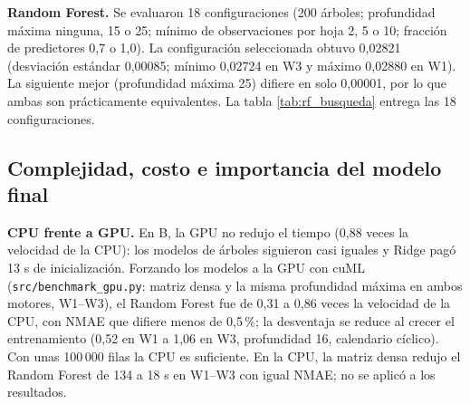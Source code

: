 \textbf{Random Forest.} Se evaluaron 18 configuraciones (200 árboles; profundidad máxima ninguna, 15 o 25; mínimo de observaciones por hoja 2, 5 o 10; fracción de predictores 0,7 o 1,0). La configuración seleccionada obtuvo 0,02821 (desviación estándar 0,00085; mínimo 0,02724 en W3 y máximo 0,02880 en W1). La siguiente mejor (profundidad máxima 25) difiere en solo 0,00001, por lo que ambas son prácticamente equivalentes. La tabla \ref{tab:rf_busqueda} entrega las 18 configuraciones.

\begin{table}[!htbp]
    \centering
        \caption{Random Forest: NMAE macro por configuración (promedio, desviación estándar, mínimo y máximo entre ventanas), ordenado por promedio. Todas con 200 árboles.\label{tab:rf_busqueda}}
        \small
        
\end{table}

\FloatBarrier
\subsection{Complejidad, costo e importancia del modelo final}

\begin{table}[!htbp]
    \centering
        \caption{Complejidad de los modelos finales ajustados con el periodo de desarrollo completo (2015--2018).\label{tab:complejidad}}
        \small
        
\end{table}

\begin{table}[!htbp]
    \centering
    \begin{minipage}[t]{0.44\textwidth}
        \caption{Ajuste final de cada procedimiento con 2015--2018 (s).\label{tab:tiempos}}
        \small
        \resizebox{\linewidth}{!}{}
    \end{minipage}\hfill
    \begin{minipage}[t]{0.52\textwidth}
        \caption{Pasos 3 a 6 de \texttt{analisis.py} (s) en el computador A y en el B, en CPU y en GPU.\label{tab:tiempos_equipos}}
        \small
        \resizebox{\linewidth}{!}{}
    \end{minipage}
\end{table}

\textbf{CPU frente a GPU.} En B, la GPU no redujo el tiempo (0,88 veces la velocidad de la CPU): los modelos de árboles siguieron casi iguales y Ridge pagó 13 s de inicialización. Forzando los modelos a la GPU con cuML (\texttt{src/benchmark\_gpu.py}: matriz densa y la misma profundidad máxima en ambos motores, W1--W3), el Random Forest fue de 0,31 a 0,86 veces la velocidad de la CPU, con NMAE que difiere menos de 0,5\,\%; la desventaja se reduce al crecer el entrenamiento (0,52 en W1 a 1,06 en W3, profundidad 16, calendario cíclico). Con unas 100\,000 filas la CPU es suficiente. En la CPU, la matriz densa redujo el Random Forest de 134 a 18 s en W1--W3 con igual NMAE; no se aplicó a los resultados.

